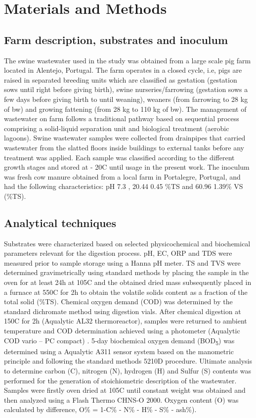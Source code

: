 \section{Materials and Methods}
\subsection{Farm description, substrates and inoculum}
The swine wastewater used in the study was obtained from a large scale pig farm located in Alentejo, Portugal. The farm operates in a closed cycle, i.e, pigs are raised in separated breeding units which are classified as gestation (gestation sows until right before giving birth), swine nurseries/farrowing (gestation sows a few days before giving birth to until weaning), weaners (from farrowing to 28 kg of bw) and growing fattening (from 28 kg to 110 kg of bw). The management of wastewater on farm follows a traditional pathway based on sequential process comprising a solid-liquid separation unit and biological treatment (aerobic lagoons). 
Swine wastewater samples were collected from drainpipes that carried wastewater from the slatted floors inside buildings to external tanks before any treatment was applied. Each sample was classified according to the different growth stages and stored at - 20\textdegree C until usage in the present work. The inoculum was fresh cow manure obtained from a local farm in Portalegre, Portugal, and had the following characteristics: pH 7.3 , 20.44  0.45 \%TS and 60.96 1.39\% VS (\%TS).

\subsection{Analytical techniques}
Substrates were characterized based on selected physicochemical and biochemical parameters relevant for the digestion process. pH, EC, ORP and TDS were measured prior to sample storage using a Hanna pH meter. TS and TVS were determined gravimetrically using standard methods by placing the sample in the oven for at least 24h at 105\textdegree C and the obtained dried mass subsequently placed in a furnace at 550\textdegree C for 2h to obtain the volatile solids content as a fraction of the total solid (\%TS). Chemical oxygen demand (COD) was determined by the standard dichromate method using digestion vials. After chemical digestion at 150\textdegree C for 2h (Aqualytic AL32 thermoreactor), samples were returned to ambient temperature and COD determination achieved using a photometer (Aqualytic COD vario – PC compact) \cite{InternationalOrganizationforStandardization2002}. 5‐day biochemical oxygen demand (BOD\textsubscript{5}) was determined using a Aqualytic A311 sensor system based on the manometric principle and following the standard methods 5210D procedure. Ultimate analysis to determine carbon (C), nitrogen (N), hydrogen (H) and Sulfur (S) contents was performed for the generation of stoichiometric description of the wastewater. Samples were firstly oven dried at 105\textdegree C until constant weight was obtained and then analyzed using a Flash Thermo CHNS-O 2000. Oxygen content (O) was calculated by difference, O\% = 1-C\% - N\% - H\% - S\% - ash\%).

